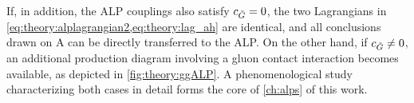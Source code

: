 If, in addition, the ALP couplings also satisfy $c_{\tilde{G}} = 0$, the two Lagrangians in \cref{eq:theory:alplagrangian2,eq:theory:lag_ah} are identical, and all conclusions drawn on A can be directly transferred to the ALP. On the other hand, if $c_{\tilde{G}} \neq 0$, an additional production diagram involving a gluon contact interaction becomes available, as depicted in \cref{fig:theory:ggALP}. A phenomenological study characterizing both cases in detail forms the core of \cref{ch:alps} of this work.

